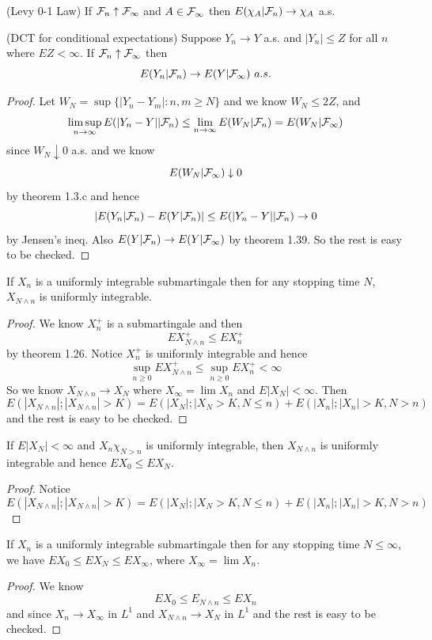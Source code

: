 \begin{theorem}
    (Levy 0-1 Law) If $\mathcal{F}_n\uparrow \mathcal{F}_{\infty}$ and $A\in\mathcal{F}_{\infty}$ then $E(\chi_A|\mathcal{F}_n) \to \chi_A$ a.s. 
\end{theorem}

\begin{theorem}
    (DCT for conditional expectations) Suppose $Y_n\to Y$ a.s. and $|Y_n| \leq Z$ for all $n$ where $EZ<\infty$. If $\mathcal{F}_n \uparrow\mathcal{F}_{\infty}$ then
    \[E(Y_n|\F_n) \to E(Y|\F_{\infty})\ a.s.\]
\end{theorem}
\begin{proof}
    Let $W_N = \sup\{|Y_n-Y_m|:n,m\geq N\}$ and we know $W_N \leq 2Z$, and
    \[
    \limsup_{n\to \infty}E(|Y_n-Y||\mathcal{F}_n) \leq \lim_{n\to\infty} E(W_N|\mathcal{F}_n) = E(W_N|\mathcal{F}_{\infty})
    \]
    since $W_N \downarrow 0$ a.s. and we know
    \[
    E(W_N|\mathcal{F}_{\infty}) \downarrow 0
    \]
    by theorem 1.3.c and hence
    \[
    |E(Y_n|\mathcal{F}_n) - E(Y|\mathcal{F}_n)| \leq E(|Y_n-Y||\mathcal{F}_n) \to 0
    \]
    by Jensen's ineq. Also $E(Y|\mathcal{F}_n) \to E(Y|\mathcal{F}_{\infty})$ by theorem 1.39. So the rest is easy to be checked.
\end{proof}

\begin{theorem}
    If $X_n$ is a uniformly integrable submartingale then for any stopping time $N$, $X_{N\wedge n}$ is uniformly integrable.
\end{theorem}
\begin{proof}
    We know $X_n^+$ is a submartingale and then
    \[EX_{N\wedge n}^+ \leq EX_n^+\]
    by theorem 1.26. Notice $X_n^+$ is uniformly integrable and hence
    \[\sup_{n\geq 0} EX_{N\wedge n}^+ \leq \sup_{n\geq 0}EX_n^+ < \infty\]
    So we know $X_{N\wedge n} \to X_N$ where $X_{\infty} = \lim X_n$ and $E|X_N| < \infty$. Then
    \[
    E(|X_{N\wedge n}|;|X_{N\wedge n}| > K) = E(|X_N|;|X_N>K, N \leq n) + E(|X_n|;|X_n|>K,N>n)
    \]
    and the rest is easy to be checked.
\end{proof}

\begin{theorem}
    If $E|X_N| < \infty$ and $X_n\chi_{N>n}$ is uniformly integrable, then $X_{N\wedge n}$ is uniformly integrable and hence $EX_0 \leq EX_N$.
\end{theorem}
\begin{proof}
    Notice
     \[
    E(|X_{N\wedge n}|;|X_{N\wedge n}| > K) = E(|X_N|;|X_N>K, N \leq n) + E(|X_n|;|X_n|>K,N>n)
    \]
\end{proof}

\begin{theorem}
    If $X_n$ is a uniformly integrable submartingale then for any stopping time $N\leq\infty$, we have $EX_0 \leq EX_N \leq EX_{\infty}$, where $X_{\infty} = \lim X_n$.
\end{theorem}
\begin{proof}
    We know
    \[EX_0 \leq E_{N\wedge n} \leq EX_n\]
    and since $X_n\to X_{\infty}$ in $L^1$ and $X_{N\wedge n} \to X_{N}$ in $L^1$ and the rest is easy to be checked.
\end{proof}

